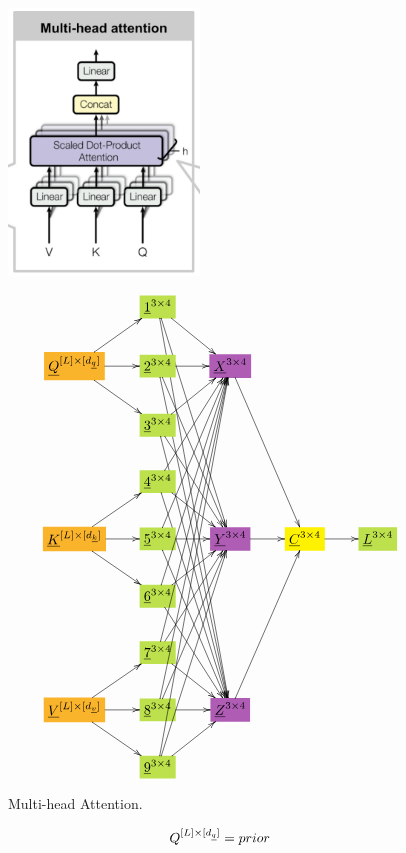 \documentclass[12pt]{article}
\begin{document}
\begin{figure}[h!]\centering
\begin{minipage}{.5\linewidth}
\includegraphics[width=2in]{multi-head-att.jpg}
\end{minipage}%
\begin{minipage}{.5\linewidth}
$$\xymatrix{
&*+[F*:SpringGreen]{\underline{1}^{3\times  4}}\ar[dr]\ar[ddddr]\ar[dddddddr]&&&
\\
*+[F*:Dandelion]{\underline{Q}^{[L]\times  [d_\rvq]}}\ar[ur]\ar[r]\ar[dr]&*+[F*:SpringGreen]{\underline{2}^{3\times  4}}\ar[r]\ar[dddr]\ar[ddddddr]&*+[F*:Orchid]{\underline{X}^{3\times  4}}\ar[dddr]&&
\\
&*+[F*:SpringGreen]{\underline{3}^{3\times  4}}\ar[ur]\ar[ddr]\ar[dddddr]&&&
\\
&*+[F*:SpringGreen]{\underline{4}^{3\times  4}}\ar[uur]\ar[dr]\ar[ddddr]&&&
\\
*+[F*:Dandelion]{\underline{K}^{[L]\times  [d_\rvk]}}\ar[ur]\ar[r]\ar[dr]&*+[F*:SpringGreen]{\underline{5}^{3\times  4}}\ar[uuur]\ar[r]\ar[dddr]&*+[F*:Orchid]{\underline{Y}^{3\times  4}}\ar[r]&*+[F*:yellow]{\underline{C}^{3\times  4}}\ar[r]&*+[F*:SpringGreen]{\underline{L}^{3\times  4}}
\\
&*+[F*:SpringGreen]{\underline{6}^{3\times  4}}\ar[uuuur]\ar[ur]\ar[ddr]&&&
\\
&*+[F*:SpringGreen]{\underline{7}^{3\times  4}}\ar[uuuuur]\ar[uur]\ar[dr]&&&
\\
*+[F*:Dandelion]{\underline{V}^{[L]\times  [d_\rvv]}}\ar[ur]\ar[r]\ar[dr]&*+[F*:SpringGreen]{\underline{8}^{3\times  4}}\ar[uuuuuur]\ar[uuur]\ar[r]&*+[F*:Orchid]{\underline{Z}^{3\times  4}}\ar[uuur]&&
\\
&*+[F*:SpringGreen]{\underline{9}^{3\times  4}}\ar[uuuuuuur]\ar[uuuur]\ar[ur]&&&
}$$
\end{minipage}
\caption{Multi-head Attention.}
\label{fig-texnn-for-multi-head-att}
\end{figure}\begin{subequations}
\begin{equation}
Q^{[L]\times  [d_{\underline{q}}]} = prior
\label{eq-Q-fun-multi-head-att}
\end{equation}


\end{subequations}
\end{document}
